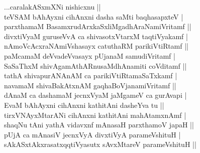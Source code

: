 \begin{entry}
\smallskip
\begin{shl}
...caralakASxmXNi nishicxnu ||\\
teVSAM bAhAyxni cihAnxni dasha saMti baqhasapxteV |\\
parxthamaM BasamxrudArxkaSxliMgadhAraNamiVritamf ||\\
divxtiVyaM guruseVvA ca shivasotxVtarxM taqtiVyakamf |\\
nAmoVcAcxraNAmiVshasayx catuthaRM parikiVtiRtamf ||\\
paMcamaM deVvadeVvasayx pUjanaM samudiVritamf |\\
SaSaThxM shivAgamAthARnusaMdhAnamiti coVditamf ||\\
tathA shivapurANAnAM ca parikiVtiRtamaSaTxkamf |\\
navamaM shivaBakAtxnAM gaqhaBoVjanamiVritamf ||\\
dAnaM ca dashamaM jecnxVyaM jaMgameV ca gurAvapi |\\
EvaM bAhAyxni cihAnxni kathitAni dasheYva tu ||\\
tirxVNAyxMtarANi cihAnxni kathitAni mahAtamxnAmf |\\
shaqNu tAni yathA vidavxnf mAnasaH parxthamoV japaH ||\\
pUjA ca mAnasiV jecnxVyA divxtiVyA parameVshituH |\\
sAkASxtAkxrasatxqqtiVyasutx sAvxMtareV parameVshituH ||
\end{shl}
\medskip
{}
\end{entry}


